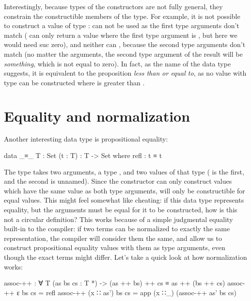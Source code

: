 		Interestingly, because types of the constructors are not fully general,
		they constrain the constructible members of the type. For example, it
		is not possible to construct a value of type :
		 can not be used as the first type arguments don't match
		( can only return a value where the first type argument is
		, but here we would need suc zero), and neither can
		, because the second type arguments don't match (no matter
		the arguments, the second type argument of the result will be
		 \emph{something}, which is not equal to zero). In fact, as
		the name of the data type suggests, it is equivalent to the proposition
		\emph{less than or equal to}, as no value with type  can
		be constructed where  is greater than .

	\section{Equality and normalization}

		Another interesting data type is propositional equality:

		\begin{code}
			data _≡_ {T : Set} (t : T) : T -> Set where
			  refl : t ≡ t
		\end{code}

		The type  takes two arguments, a type , and two
		values of that type ( is the first, and the second is
		unnamed).  Since the constructor can only construct values which have
		the same value as both type arguments,  will only be
		constructible for equal values. This might feel somewhat like cheating:
		if this data type represents equality, but the arguments must be equal
		for it to be constructed, how is this not a circular definition? This
		works because of a simple judgmental equality built-in to the
		compiler: if two terms can be normalized to exactly the same
		representation, the compiler will consider them the same, and allow us
		to construct propositional equality values with them as type arguments,
		even though the exact terms might differ. Let's take a quick look at
		how normalization works:

		\begin{code}
			assoc-++ : ∀ {T} (as bs cs : T *) -> (as ++ bs) ++ cs ≡ as ++ (bs ++ cs)
			assoc-++ ε bs cs = refl
			assoc-++ (x ∷ as') bs cs = app (x ∷_) (assoc-++ as' bs cs)
		\end{code}

